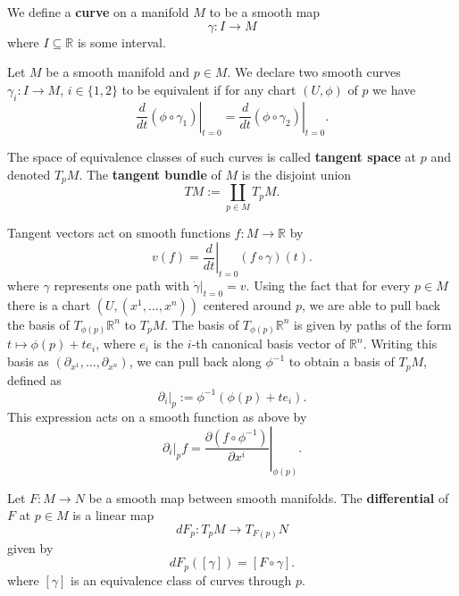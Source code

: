 We define a \textbf{curve} on a manifold $M$ to be a smooth map \[
\gamma: I \to M
\] 
where $I \subseteq \mathbb{R}$ is some interval.
\begin{definition}
    Let $M$ be a smooth manifold and $p \in M$. We declare two smooth curves $\gamma_i: I \to M$, $i \in \{1,2\}$ to be equivalent if for any chart $(U,\phi)$ of $p$ we have 
    \begin{equation}
        \left.\frac{d}{dt} (\phi \circ \gamma_1)\right|_{t=0} = \left.\frac{d}{dt} (\phi \circ \gamma_2)\right|_{t=0}.
    \end{equation}
    
    The space of equivalence classes of such curves is called \textbf{tangent space} at $p$ and denoted $T_pM$. The \textbf{tangent bundle} of $M$ is the disjoint union  \[
        TM := \coprod_{p \in M} T_pM
    .\] 
\end{definition}
Tangent vectors act on smooth functions $f: M \to \mathbb{R}$ by
\[
    v(f)=\left.\frac{d}{dt}\right|_{t=0}(f \circ \gamma)(t)
.\] 
where $\gamma$ represents one path with $\dot{\gamma}|_{t=0}=v$. 
Using the fact that for every $p \in M$ there is a chart $(U, (x^1, \dots, x^n))$ centered around $p$, we are able to pull back the basis of $T_{\phi(p)}\mathbb{R}^n$ to $T_pM$. The basis of $T_{\phi(p)}\mathbb{R}^n$ is given by paths of the form $t \mapsto \phi(p) +te_i$, where $e_i$ is the $i$-th canonical basis vector of $\mathbb{R}^n$. Writing this basis as $(\partial_{x^1}, \dots, \partial_{x^n})$, we can pull back along $\phi^{-1}$ to obtain a basis of $T_pM$, defined as
\[
    \partial_i|_p := \phi^{-1}(\phi(p)+te_i)
.\] This expression acts on a smooth function as above by
\[
    \partial_i|_p f = \left.\frac{\partial(f \circ \phi^{-1})}{\partial x^i}\right|_{\phi(p)}
.\] 
\begin{definition}[Differential]
    Let $F: M \to N$ be a smooth map between smooth manifolds. The \textbf{differential} of $F$ at $p \in M$ is a linear map 
    \[
        dF_p: T_pM \to T_{F(p)}N
    \]
    given by \[
        dF_p([\gamma])=[F \circ \gamma]
    .\] where $[\gamma]$ is an equivalence class of curves through $p$.
\end{definition}
